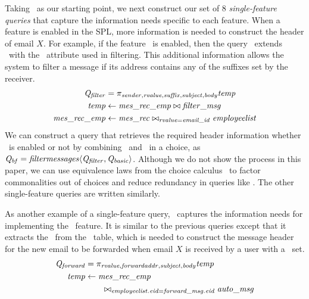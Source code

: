 Taking \Qbasic\ as our starting point, we next construct our set of $8$
\emph{single-feature queries} that capture the information needs specific to
each feature.
%
When a feature is enabled in the SPL, more information is needed to construct
the header of email $X$. For example, if the feature \filtermessages\ is
enabled, then the query \Qfilter\ extends \Qbasic\ with the \suffix\ attribute
used in filtering. This additional information allows the system to filter a
message if its address contains any of the suffixes set by the receiver.
%
%
\begin{align*}
\Qfilter &= 
\projectRel{\sender,\rvalue,\suffix,\subject,\body} \temp \\
\temp & \leftarrow \mretable
 \bowtie \filtermsg \\
\mretable &\leftarrow \joinRel{\mrtable}{\employees}{\rvalue=\emailid}
\end{align*}
%
%
We can construct a query that retrieves the required header information whether
\filtermessages\ is enabled or not by combining \Qbasic\ and \Qfilter\ in a
choice, as $\Qbf=\chc[\filtermessages]{\Qfilter,\Qbasic}$. 
%
Although we do not show the process in this paper, we can use equivalence laws
from the choice calculus~\cite{EW11tosem,HW16fosd} to factor commonalities out
of choices and reduce redundancy in queries like \Qbf.
The other single-feature queries are written similarly.



As another example of a single-feature query, \Qforward\ captures the
information needs for implementing the \forwardmessages\ feature. It is similar
to the previous queries except that it extracts the \forwardaddr\ from the
\automsg\ table, which is needed to construct the message header for the new
email to be forwarded when email $X$ is received by a user with a \forwardaddr\
set.
%
\begin{align*}
\Qforward &=
\projectRel{\rvalue,\forwardaddr,\subject,\body}{\temp} \\
\temp &\leftarrow \mretable \\
&\qquad \bowtie_{\employees.\eid = \forwardmsg.\eid} \automsg
\end{align*}

